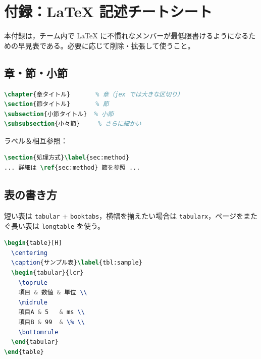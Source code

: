 \chapter{付録：LaTeX 記述チートシート}
\label{ch:latex_cheatsheet}

本付録は，チーム内で LaTeX に不慣れなメンバーが最低限書けるようになるための早見表である。必要に応じて削除・拡張して使うこと。

\section{章・節・小節}

\begin{lstlisting}[language=TeX]
\chapter{章タイトル}       % 章（jex では大きな区切り）
\section{節タイトル}       % 節
\subsection{小節タイトル}  % 小節
\subsubsection{小々節}     % さらに細かい
\end{lstlisting}

ラベル＆相互参照：

\begin{lstlisting}[language=TeX]
\section{処理方式}\label{sec:method}
... 詳細は \ref{sec:method} 節を参照 ...
\end{lstlisting}

\section{表の書き方}

短い表は \verb|tabular| + \verb|booktabs|，横幅を揃えたい場合は \verb|tabularx|，ページをまたぐ長い表は \verb|longtable| を使う。

\begin{lstlisting}[language=TeX]
\begin{table}[H]
  \centering
  \caption{サンプル表}\label{tbl:sample}
  \begin{tabular}{lcr}
    \toprule
    項目 & 数値 & 単位 \\
    \midrule
    項目A & 5   & ms \\
    項目B & 99  & \% \\
    \bottomrule
  \end{tabular}
\end{table}
\end{lstlisting}

